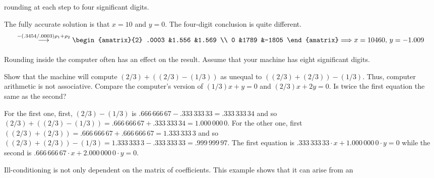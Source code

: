 \begin{exercises}
\begin{exparts*}
         rounding at each step to four significant digits. 
    \end{exparts*}
    \begin{answer}
      \begin{exparts}
        \partsitem The fully accurate solution is that $x=10$ and $y=0$.
        \partsitem The four-digit conclusion is quite different.
          \begin{equation*}
            \grstep{-(.3454/.0003)\rho_1+\rho_2}
            \begin{amatrix}{2}
              .0003  &1.556  &1.569  \\
              0      &1789   &-1805
            \end{amatrix}
            \Longrightarrow
            x=10460,\,y=-1.009
          \end{equation*}
      \end{exparts}
    \end{answer}
  \item 
    Rounding inside the computer often has an effect on the result.
    Assume that your machine has eight significant digits.
    \begin{exparts}
      \partsitem Show that the machine will compute 
         $(2/3)+((2/3)-(1/3))$ as unequal to $((2/3)+(2/3))-(1/3)$.
         Thus, computer arithmetic is not associative.
      \partsitem Compare the computer's version of $(1/3)x+y=0$
        and $(2/3)x+2y=0$.
        Is twice the first equation the same as the second?
    \end{exparts}
    \begin{answer}
      \begin{exparts}
        \partsitem For the first one, first, $(2/3)-(1/3)$ is 
          $.666\,666\,67-.333\,333\,33=.333\,333\,34$
          and so 
          $(2/3)+((2/3)-(1/3))=.666\,666\,67+.333\,333\,34=1.000\,000\,0$.
          For the other one, first 
          $((2/3)+(2/3))=.666\,666\,67+.666\,666\,67=1.333\,333\,3$
          and so 
          $((2/3)+(2/3))-(1/3)=1.333\,333\,3-.333\,333\,33=.999\,999\,97$.
        \partsitem The first equation is 
          $.333\,333\,33\cdot x+1.000\,000\,0\cdot y=0$
          while the second is 
          $.666\,666\,67\cdot x+2.000\,000\,0\cdot y=0$.
      \end{exparts}
    \end{answer}
  \item 
    Ill-conditioning is not only dependent on the matrix of
    coefficients.
    This example \cite{Hamming} shows that it can arise from an

\end{exercises}
